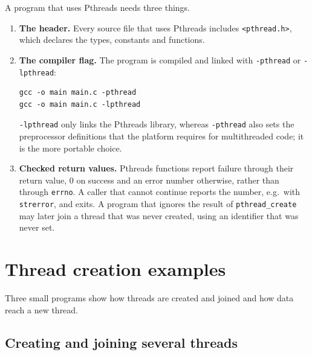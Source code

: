 \documentclass[../main.tex]{subfiles}
\begin{document}
A program that uses Pthreads needs three things.
\begin{enumerate}
  \item \textbf{The header.}  Every source file that uses Pthreads includes
    \texttt{<pthread.h>}, which declares the types, constants and
    functions.
  \item \textbf{The compiler flag.}  The program is compiled and linked
    with \texttt{-pthread} or \texttt{-lpthread}:
\begin{lstlisting}[numbers=none]
gcc -o main main.c -pthread
gcc -o main main.c -lpthread
\end{lstlisting}
    \texttt{-lpthread} only links the Pthreads library, whereas
    \texttt{-pthread} also sets the preprocessor definitions that the
    platform requires for multithreaded code; it is the more portable
    choice.
  \item \textbf{Checked return values.}  Pthreads functions report failure
    through their return value, 0 on success and an error number
    otherwise, rather than through \texttt{errno}.  A caller that cannot
    continue reports the number, e.g.\ with \texttt{strerror}, and exits.
    A program that ignores the result of \texttt{pthread\_create} may later
    join a thread that was never created, using an identifier that was
    never set.
\end{enumerate}

\section{Thread creation examples}
\label{sec:l04-examples}

Three small programs show how threads are created and joined and how data
reach a new thread.

\subsection{Creating and joining several threads}
\end{document}
